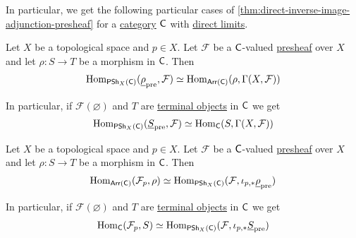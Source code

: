 \documentclass[../../../main]{subfiles}
\begin{document}
In particular, we get the following particular cases of \autoref{thm:direct-inverse-image-adjunction-presheaf} for a \hyperref[def:category]{category} \(\mathsf{C}\) with \hyperref[def:direct-limit]{direct limits}.
\begin{corollary} \label{cor:constant-global-adjunction-presheaf}
  Let \(X\) be a topological space and \(p \in X\).
  Let \(\mathcal{F}\) be a \(\mathsf{C}\)-valued \hyperref[def:presheaf]{presheaf} over \(X\) and let \(\rho: S \to T\) be a morphism in \(\mathsf{C}\).
  Then
  \begin{align*}
    \operatorname{Hom}_{\mathsf{PSh}_{X}(\mathsf{C})}(\underline{\rho}_{\operatorname{pre}}, \mathcal{F}) \simeq \operatorname{Hom}_{\mathsf{Arr}(\mathsf{C})}(\rho, \Gamma(X, \mathcal{F}))
  \end{align*}

  In particular, if \(\mathcal{F}(\varnothing)\) and \(T\) are \hyperref[def:initial-terminal-object]{terminal objects} in \(\mathsf{C}\) we get
  \begin{align*}
    \operatorname{Hom}_{\mathsf{PSh}_{X}(\mathsf{C})}(\underline{S}_{\operatorname{pre}}, \mathcal{F}) \simeq \operatorname{Hom}_{\mathsf{C}}(S, \Gamma(X, \mathcal{F}))
  \end{align*}
\end{corollary}

\begin{corollary} \label{cor:stalk-skyscraper-adjunction-presheaf}
  Let \(X\) be a topological space and \(p \in X\).
  Let \(\mathcal{F}\) be a \(\mathsf{C}\)-valued \hyperref[def:presheaf]{presheaf} over \(X\) and let \(\rho: S \to T\) be a morphism in \(\mathsf{C}\).
  Then
  \begin{align*}
    \operatorname{Hom}_{\mathsf{Arr}(\mathsf{C})}(\mathcal{F}_{p}, \rho) \simeq \operatorname{Hom}_{\mathsf{PSh}_{X}(\mathsf{C})}(\mathcal{F}, \iota_{p, \ast} \underline{\rho}_{\operatorname{pre}} )
  \end{align*}

  In particular, if \(\mathcal{F}(\varnothing)\) and \(T\) are \hyperref[def:initial-terminal-object]{terminal objects} in \(\mathsf{C}\) we get
  \begin{align*}
    \operatorname{Hom}_{\mathsf{C}}(\mathcal{F}_{p}, S) \simeq \operatorname{Hom}_{\mathsf{PSh}_{X}(\mathsf{C})}(\mathcal{F}, \iota_{p, \ast} \underline{S}_{\operatorname*{pre}})
  \end{align*}
\end{corollary}
\end{document}
